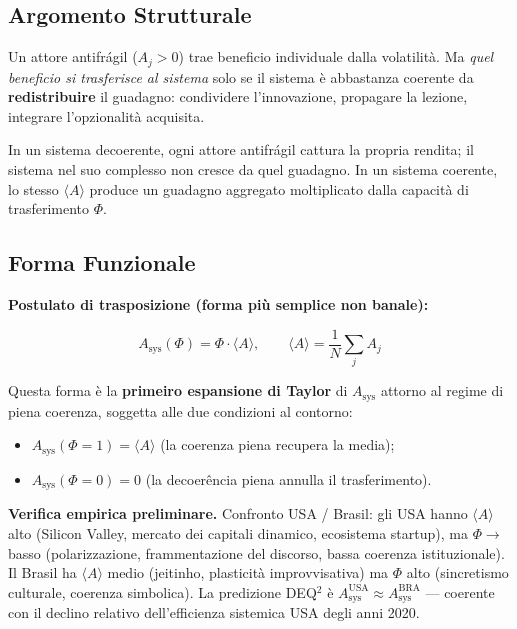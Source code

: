 \subsection{Argomento Strutturale}\label{argomento-estrutural}

Un attore antifrágil (\(A_j > 0\)) trae beneficio individuale dalla
volatilità. Ma \emph{quel beneficio si trasferisce al sistema} solo se
il sistema è abbastanza coerente da \textbf{redistribuire} il guadagno:
condividere l'innovazione, propagare la lezione, integrare l'opzionalità
acquisita.

In un sistema decoerente, ogni attore antifrágil cattura la propria
rendita; il sistema nel suo complesso non cresce da quel guadagno. In un
sistema coerente, lo stesso \(\langle A \rangle\) produce un guadagno
aggregato moltiplicato dalla capacità di trasferimento \(\Phi\).

\subsection{Forma Funzionale}\label{forma-funzionale}

\Hypoth{} \textbf{Postulato di trasposizione (forma più semplice non
banale):}

\[
A_{\text{sys}}(\Phi) = \Phi \cdot \langle A \rangle, \qquad \langle A \rangle = \frac{1}{N}\sum_j A_j
\]

Questa forma è la \textbf{primeiro espansione di Taylor} di
\(A_{\text{sys}}\) attorno al regime di piena coerenza, soggetta alle
due condizioni al contorno:

\begin{itemize}
\tightlist
\item
  \(A_{\text{sys}}(\Phi = 1) = \langle A \rangle\) (la coerenza piena
  recupera la media);
\item
  \(A_{\text{sys}}(\Phi = 0) = 0\) (la decoerência piena annulla il
  trasferimento).
\end{itemize}

\Proved{} \textbf{Verifica empirica preliminare.} Confronto USA /
Brasil: gli USA hanno \(\langle A \rangle\) alto (Silicon Valley,
mercato dei capitali dinamico, ecosistema startup), ma \(\Phi \to\)
basso (polarizzazione, frammentazione del discorso, bassa coerenza
istituzionale). Il Brasil ha \(\langle A \rangle\) medio (jeitinho,
plasticità improvvisativa) ma \(\Phi\) alto (sincretismo culturale,
coerenza simbolica). La predizione DEQ$^2$ è
\(A_{\text{sys}}^{\text{USA}} \approx A_{\text{sys}}^{\text{BRA}}\) ---
coerente con il declino relativo dell'efficienza sistemica USA degli
anni 2020.

